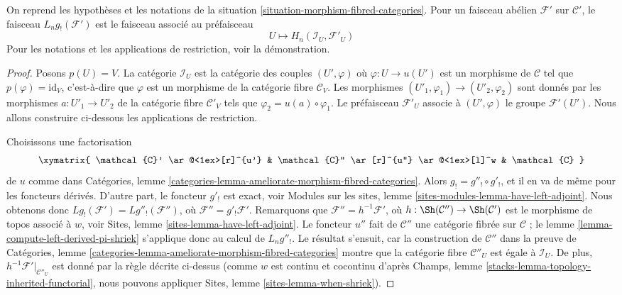 \begin{lemma}
\label{lemma-compute-left-derived-g-shriek}
On reprend les hypothèses et les notations de la
situation \ref{situation-morphism-fibred-categories}.
Pour un faisceau abélien $\mathcal{F}'$ sur $\mathcal{C}'$, le faisceau
$L_ng_!(\mathcal{F}')$ est le faisceau associé au préfaisceau
$$
U \longmapsto H_n(\mathcal{I}_U, \mathcal{F}'_U)
$$
Pour les notations et les applications de restriction, voir la démonstration.
\end{lemma}

\begin{proof}
Posons $p(U) = V$. La catégorie $\mathcal{I}_U$ est la catégorie des couples
$(U', \varphi)$ où $\varphi : U \to u(U')$ est un morphisme de $\mathcal{C}$
tel que $p(\varphi) = \text{id}_V$, c'est-à-dire que $\varphi$ est un morphisme de la
catégorie fibre $\mathcal{C}_V$. Les morphismes
$(U'_1, \varphi_1) \to (U'_2, \varphi_2)$ sont donnés par les morphismes
$a : U'_1 \to U'_2$ de la catégorie fibre $\mathcal{C}'_V$ tels que
$\varphi_2 = u(a) \circ \varphi_1$. Le préfaisceau $\mathcal{F}'_U$ associe
à $(U', \varphi)$ le groupe $\mathcal{F}'(U')$.
Nous allons construire ci-dessous les applications de restriction.

\medskip\noindent
Choisissons une factorisation
$$
\xymatrix{
\mathcal{C}' \ar@<1ex>[r]^{u'} &
\mathcal{C}'' \ar[r]^{u''} \ar@<1ex>[l]^w & \mathcal{C}
}
$$
de $u$ comme dans
Catégories, lemme \ref{categories-lemma-ameliorate-morphism-fibred-categories}.
Alors $g_! = g''_! \circ g'_!$, et il en va de même pour les foncteurs dérivés.
D'autre part, le foncteur $g'_!$ est exact, voir
Modules sur les sites, lemme \ref{sites-modules-lemma-have-left-adjoint}.
Nous obtenons donc $Lg_!(\mathcal{F}') = Lg''_!(\mathcal{F}'')$, où
$\mathcal{F}'' = g'_!\mathcal{F}'$. Remarquons que
$\mathcal{F}'' = h^{-1}\mathcal{F}'$, où
$h : \Sh(\mathcal{C}'') \to \Sh(\mathcal{C}')$ est le morphisme de topos
associé à $w$, voir
Sites, lemme \ref{sites-lemma-have-left-adjoint}.
Le foncteur $u''$ fait de $\mathcal{C}''$ une catégorie fibrée
sur $\mathcal{C}$ ; le
lemme \ref{lemma-compute-left-derived-pi-shriek}
s'applique donc au calcul de $L_ng''_!$. Le résultat s'ensuit, car la
construction de $\mathcal{C}''$ dans la preuve de
Catégories, lemme \ref{categories-lemma-ameliorate-morphism-fibred-categories}
montre que la catégorie fibre $\mathcal{C}''_U$ est égale à
$\mathcal{I}_U$. De plus, $h^{-1}\mathcal{F}'|_{\mathcal{C}''_U}$
est donné par la règle décrite ci-dessus
(comme $w$ est continu et cocontinu d'après
Champs, lemme \ref{stacks-lemma-topology-inherited-functorial},
nous pouvons appliquer
Sites, lemme \ref{sites-lemma-when-shriek}).
\end{proof}
